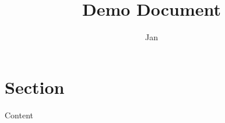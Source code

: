 \documentclass[12pt,a4paper]{article}
\title{Demo Document}
\author{Jan}
\begin{document}
\maketitle

\section{Section}
Content
\end{document}
